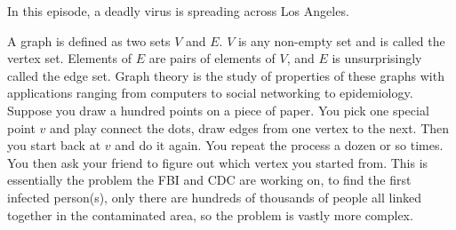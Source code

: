 \newpage
{}
{}
\setcounter{activity}{0}

In this episode, a deadly virus is spreading across Los Angeles. 



A graph is defined as two sets $V$ and $E$. $V$ is any non-empty set and is called the vertex set. Elements of $E$ are pairs of elements of $V$, and $E$ is unsurprisingly called the edge set. Graph theory is the study of properties of these graphs with applications ranging from computers to social networking to epidemiology. Suppose you draw a hundred points on a piece of paper. You pick one special point $v$ and play connect the dots, draw edges from one vertex to the next. Then you start back at $v$ and do it again. You repeat the process a dozen or so times. You then ask your friend to figure out which vertex you started from. This is essentially the problem the FBI and CDC are working on, to find the first infected person(s), only there are hundreds of thousands of people all linked together in the contaminated area, so the problem is vastly more complex.


